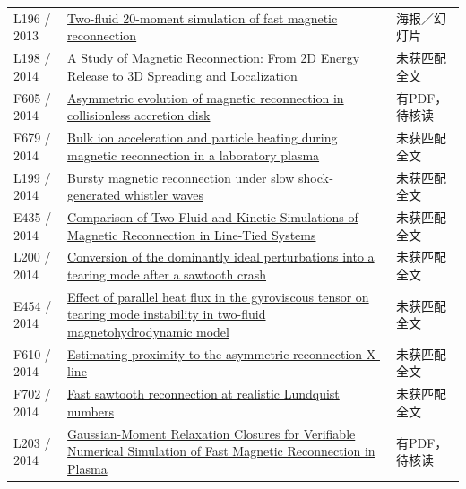 \begin{longtable}{P{24mm}P{97mm}P{27mm}}
L196 / 2013 & \href{https://lirias.kuleuven.be/handle/123456789/463177}{Two-fluid 20-moment simulation of fast magnetic reconnection} & 海报／幻灯片\\

L198 / 2014 & \href{https://doi.org/10.33915/etd.6627}{A Study of Magnetic Reconnection: From 2D Energy Release to 3D Spreading and Localization} & 未获匹配全文\\

F605 / 2014 & \href{https://doi.org/10.1063/1.4875739}{Asymmetric evolution of magnetic reconnection in collisionless accretion disk} & 有PDF，待核读\\

F679 / 2014 & \href{https://doi.org/10.1063/1.4874331}{Bulk ion acceleration and particle heating during magnetic reconnection in a laboratory plasma} & 未获匹配全文\\

L199 / 2014 & \href{https://doi.org/10.1002/2014ja020190}{Bursty magnetic reconnection under slow shock‐generated whistler waves} & 未获匹配全文\\

E435 / 2014 & \href{https://agu.confex.com/agu/fm14/webprogram/Paper27518.html}{Comparison of Two-Fluid and Kinetic Simulations of Magnetic Reconnection in Line-Tied Systems} & 未获匹配全文\\

L200 / 2014 & \href{https://doi.org/10.1063/1.4902106}{Conversion of the dominantly ideal perturbations into a tearing mode after a sawtooth crash} & 未获匹配全文\\

E454 / 2014 & \href{http://absimage.aps.org/image/DPP14/MWS_DPP14-2014-000895.pdf}{Effect of parallel heat flux in the gyroviscous tensor on tearing mode instability in two-fluid magnetohydrodynamic model} & 未获匹配全文\\

F610 / 2014 & \href{https://scholars.unh.edu/dissertation/2170}{Estimating proximity to the asymmetric reconnection X-line} & 未获匹配全文\\

F702 / 2014 & \href{https://doi.org/10.1088/0741-3335/57/1/014017}{Fast sawtooth reconnection at realistic Lundquist numbers} & 未获匹配全文\\

L203 / 2014 & \href{https://doi.org/10.48550/arxiv.1409.6985}{Gaussian-Moment Relaxation Closures for Verifiable Numerical Simulation of Fast Magnetic Reconnection in Plasma} & 有PDF，待核读\\


\end{longtable}
